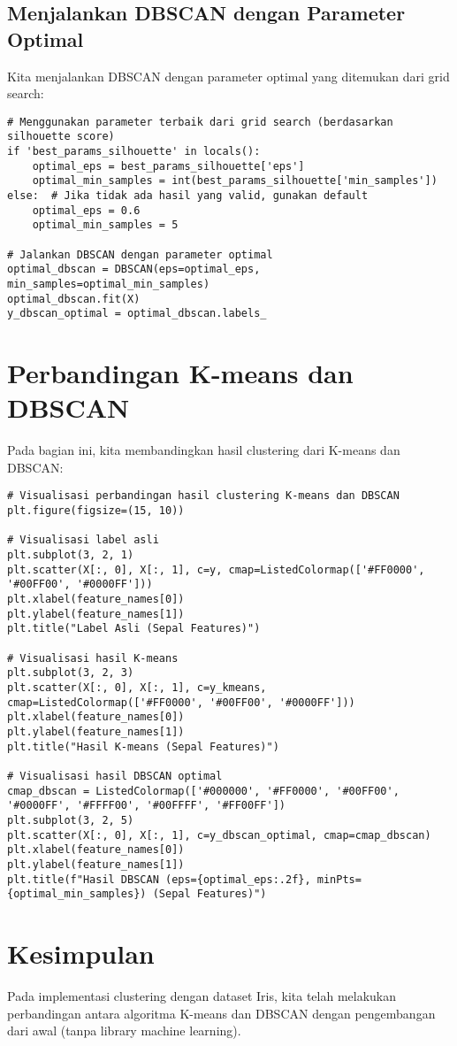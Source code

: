 \documentclass[a4paper,12pt]{article}
\begin{document}
\subsection{Menjalankan DBSCAN dengan Parameter Optimal}
Kita menjalankan DBSCAN dengan parameter optimal yang ditemukan dari grid search:
\begin{lstlisting}
# Menggunakan parameter terbaik dari grid search (berdasarkan silhouette score)
if 'best_params_silhouette' in locals():
    optimal_eps = best_params_silhouette['eps']
    optimal_min_samples = int(best_params_silhouette['min_samples'])
else:  # Jika tidak ada hasil yang valid, gunakan default
    optimal_eps = 0.6
    optimal_min_samples = 5
    
# Jalankan DBSCAN dengan parameter optimal
optimal_dbscan = DBSCAN(eps=optimal_eps, min_samples=optimal_min_samples)
optimal_dbscan.fit(X)
y_dbscan_optimal = optimal_dbscan.labels_
\end{lstlisting}

\section{Perbandingan K-means dan DBSCAN}
Pada bagian ini, kita membandingkan hasil clustering dari K-means dan DBSCAN:

\begin{lstlisting}
# Visualisasi perbandingan hasil clustering K-means dan DBSCAN
plt.figure(figsize=(15, 10))

# Visualisasi label asli
plt.subplot(3, 2, 1)
plt.scatter(X[:, 0], X[:, 1], c=y, cmap=ListedColormap(['#FF0000', '#00FF00', '#0000FF']))
plt.xlabel(feature_names[0])
plt.ylabel(feature_names[1])
plt.title("Label Asli (Sepal Features)")

# Visualisasi hasil K-means
plt.subplot(3, 2, 3)
plt.scatter(X[:, 0], X[:, 1], c=y_kmeans, cmap=ListedColormap(['#FF0000', '#00FF00', '#0000FF']))
plt.xlabel(feature_names[0])
plt.ylabel(feature_names[1])
plt.title("Hasil K-means (Sepal Features)")

# Visualisasi hasil DBSCAN optimal
cmap_dbscan = ListedColormap(['#000000', '#FF0000', '#00FF00', '#0000FF', '#FFFF00', '#00FFFF', '#FF00FF'])
plt.subplot(3, 2, 5)
plt.scatter(X[:, 0], X[:, 1], c=y_dbscan_optimal, cmap=cmap_dbscan)
plt.xlabel(feature_names[0])
plt.ylabel(feature_names[1])
plt.title(f"Hasil DBSCAN (eps={optimal_eps:.2f}, minPts={optimal_min_samples}) (Sepal Features)")
\end{lstlisting}

\section{Kesimpulan}
Pada implementasi clustering dengan dataset Iris, kita telah melakukan perbandingan antara algoritma K-means dan DBSCAN dengan pengembangan dari awal (tanpa library machine learning).
\end{document}
